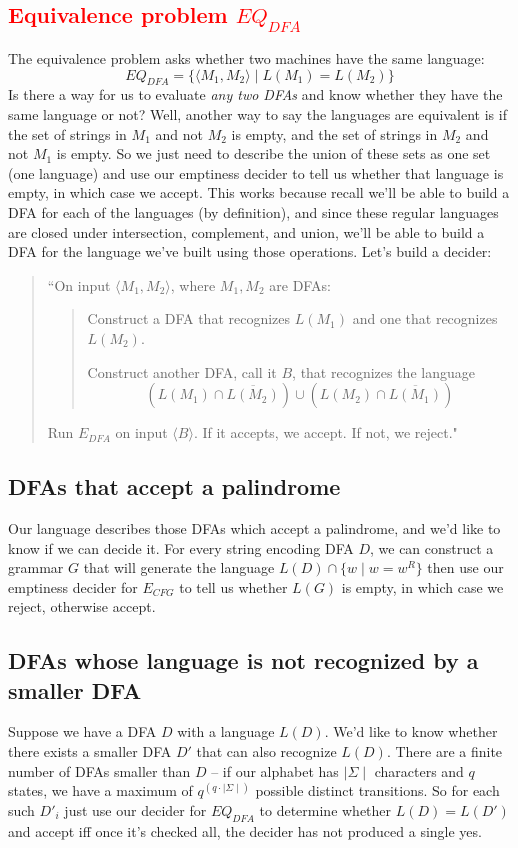 \documentclass[11pt]{article}
\begin{document}
\subsection{\textcolor{red}{Equivalence problem $EQ_{DFA}$}}
The equivalence problem asks whether two machines have the same language:
\[EQ_{DFA} = \{\langle M_1, M_2 \rangle \mid L(M_1) = L(M_2)\}\]
Is there a way for us to evaluate \emph{any two DFAs} and know whether they have the same language or not? Well, another way to say the languages are equivalent is if the set of strings in $M_1$ and not $M_2$ is empty, and the set of strings in $M_2$ and not $M_1$ is empty. So we just need to describe the union of these sets as one set (one language) and use our emptiness decider to tell us whether that language is empty, in which case we accept. This works because recall we'll be able to build a DFA for each of the languages (by definition), and since these regular languages are closed under intersection, complement, and union, we'll be able to build a DFA for the language we've built using those operations. Let's build a decider:
\begin{quote}
``On input $\langle M_1, M_2 \rangle$, where $M_1, M_2$ are DFAs:

\begin{quote}
Construct a DFA that recognizes $L(M_1)$ and one that recognizes $L(M_2)$.

Construct another DFA, call it $B$, that recognizes the language \[(L(M_1) \cap \overline{L(M_2)}) \cup (L(M_2) \cap \overline{L(M_1)})\]

\end{quote}
Run $E_{DFA}$ on input $\langle B \rangle$. If it accepts, we accept. If not, we reject."
\end{quote}

\subsection{DFAs that accept a palindrome}
Our language describes those DFAs which accept a palindrome, and we'd like to know if we can decide it. For every string encoding DFA $D$, we can construct a grammar $G$ that will generate the language $L(D) \cap \{w \mid w = w^R\}$ then use our emptiness decider for $E_{CFG}$ to tell us whether $L(G)$ is empty, in which case we reject, otherwise accept.

\subsection{DFAs whose language is not recognized by a smaller DFA}
Suppose we have a DFA $D$ with a language $L(D)$. We'd like to know whether there exists a smaller DFA $D'$ that can also recognize $L(D)$. There are a finite number of DFAs smaller than $D$ -- if our alphabet has $\mid \Sigma \mid$ characters and $q$ states, we have a maximum of $q^{(q \cdot \mid \Sigma \mid)}$ possible distinct transitions. So for each such $D'_i$ just use our decider for $EQ_{DFA}$ to determine whether $L(D) = L(D')$ and accept iff once it's checked all, the decider has not produced a single yes. 
\end{document}
